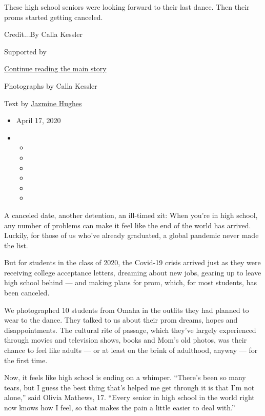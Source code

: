 These high school seniors were looking forward to their last dance. Then
their proms started getting canceled.

Credit...By Calla Kessler

Supported by

\protect\hyperlink{after-sponsor}{Continue reading the main story}

Photographs by Calla Kessler

Text by
\href{https://www.nytimes3xbfgragh.onion/by/jazmine-hughes}{Jazmine
Hughes}

\begin{itemize}
\item
  April 17, 2020
\item
  \begin{itemize}
  \item
  \item
  \item
  \item
  \item
  \item
  \end{itemize}
\end{itemize}

A canceled date, another detention, an ill-timed zit: When you're in
high school, any number of problems can make it feel like the end of the
world has arrived. Luckily, for those of us who've already graduated, a
global pandemic never made the list.

But for students in the class of 2020, the Covid-19 crisis arrived just
as they were receiving college acceptance letters, dreaming about new
jobs, gearing up to leave high school behind --- and making plans for
prom, which, for most students, has been canceled.

We photographed 10 students from Omaha in the outfits they had planned
to wear to the dance. They talked to us about their prom dreams, hopes
and disappointments. The cultural rite of passage, which they've largely
experienced through movies and television shows, books and Mom's old
photos, was their chance to feel like adults --- or at least on the
brink of adulthood, anyway --- for the first time.

Now, it feels like high school is ending on a whimper. ``There's been so
many tears, but I guess the best thing that's helped me get through it
is that I'm not alone,'' said Olivia Mathews, 17. ``Every senior in high
school in the world right now knows how I feel, so that makes the pain a
little easier to deal with.''

